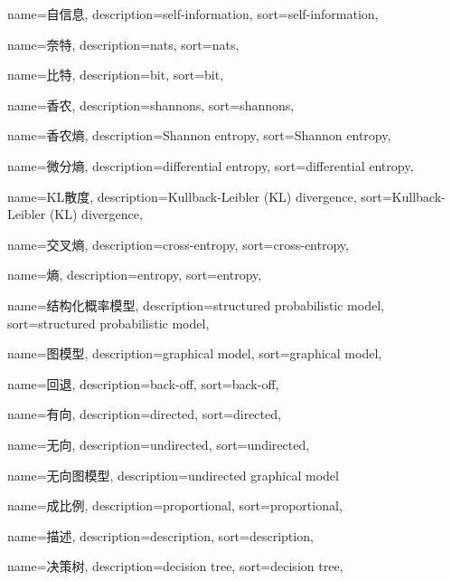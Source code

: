 {
  name=自信息,
  description={self-information},
  sort={self-information},
}

{
  name=奈特,
  description={nats},
  sort={nats},
}

{
  name=比特,
  description={bit},
  sort={bit},
}

{
  name=香农,
  description={shannons},
  sort={shannons},
}

{
  name=香农熵,
  description={Shannon entropy},
  sort={Shannon entropy},
}

{
  name=微分熵,
  description={differential entropy},
  sort={differential entropy},
}

{
  name=KL散度,
  description={Kullback-Leibler (KL) divergence},
  sort={Kullback-Leibler (KL) divergence},
}

{
  name=交叉熵,
  description={cross-entropy},
  sort={cross-entropy},
}

{
	name=熵,
	description={entropy},
	sort={entropy},
}

{
  name=结构化概率模型,
  description={structured probabilistic model},
  sort={structured probabilistic model},
}

{
  name=图模型,
  description={graphical model},
  sort={graphical model},
}

{
  name=回退,
  description={back-off},
  sort={back-off},
}

{
  name=有向,
  description={directed},
  sort={directed},
}

{
  name=无向,
  description={undirected},
  sort={undirected},
}

{
  name=无向图模型,
  description={undirected graphical model}
}

{
  name=成比例,
  description={proportional},
  sort={proportional},
}

{
  name=描述,
  description={description},
  sort={description},
}

{
  name=决策树,
  description={decision tree},
  sort={decision tree},
}

